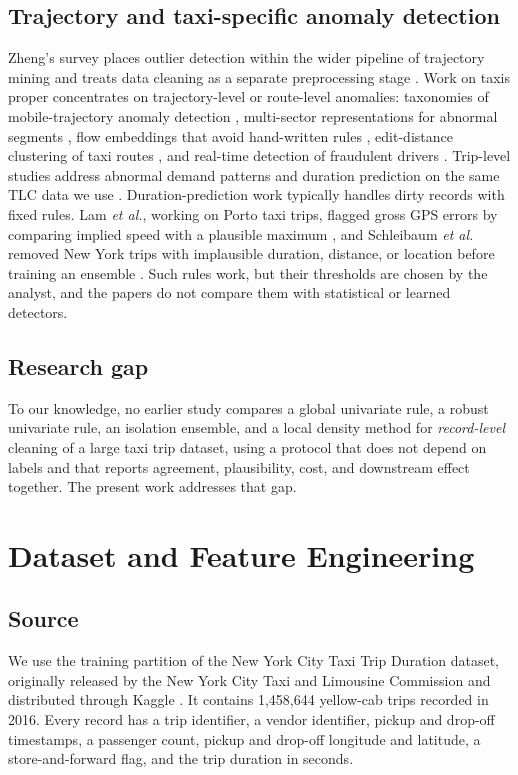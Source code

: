 \documentclass{ieeeaccess}
\begin{document}
\subsection{Trajectory and taxi-specific anomaly detection}
Zheng's survey places outlier detection within the wider pipeline of trajectory mining and treats data cleaning as a separate preprocessing stage \cite{zheng2015}. Work on taxis proper concentrates on trajectory-level or route-level anomalies: taxonomies of mobile-trajectory anomaly detection \cite{kong2024}, multi-sector representations for abnormal segments \cite{huang2026}, flow embeddings that avoid hand-written rules \cite{frantzen2021}, edit-distance clustering of taxi routes \cite{wang2018}, and real-time detection of fraudulent drivers \cite{eldawy2021}. Trip-level studies address abnormal demand patterns \cite{markou2017} and duration prediction on the same TLC data we use \cite{poongodi2022}. Duration-prediction work typically handles dirty records with fixed rules. Lam \emph{et al.}, working on Porto taxi trips, flagged gross GPS errors by comparing implied speed with a plausible maximum \cite{lam2015}, and Schleibaum \emph{et al.} removed New York trips with implausible duration, distance, or location before training an ensemble \cite{schleibaum2022}. Such rules work, but their thresholds are chosen by the analyst, and the papers do not compare them with statistical or learned detectors.

\subsection{Research gap}
To our knowledge, no earlier study compares a global univariate rule, a robust univariate rule, an isolation ensemble, and a local density method for \emph{record-level} cleaning of a large taxi trip dataset, using a protocol that does not depend on labels and that reports agreement, plausibility, cost, and downstream effect together. The present work addresses that gap.

\section{Dataset and Feature Engineering}
\label{sec:data}

\subsection{Source}
We use the training partition of the New York City Taxi Trip Duration dataset, originally released by the New York City Taxi and Limousine Commission and distributed through Kaggle \cite{tlc2016}. It contains 1,458,644 yellow-cab trips recorded in 2016. Every record has a trip identifier, a vendor identifier, pickup and drop-off timestamps, a passenger count, pickup and drop-off longitude and latitude, a store-and-forward flag, and the trip duration in seconds.
\end{document}
